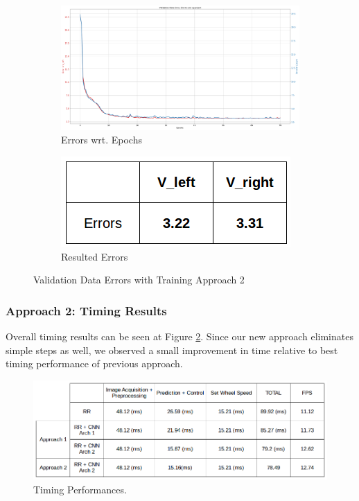 \documentclass[11pt,letterpaper]{article}
\begin{document}
	\begin{figure}[h!]
		\centering
		\begin{subfigure}[b]{0.84\linewidth}
			\includegraphics[width=\linewidth]{err-app2.png}
			\caption{Errors wrt. Epochs}
		\end{subfigure}
		\begin{subfigure}[b]{0.14\linewidth}
			\includegraphics[width=\linewidth]{err-app2-table.png}
			\caption{Resulted Errors}
		\end{subfigure}
		\caption{Validation Data Errors with Training Approach 2}
		\label{fig:12}
	\end{figure}  
	
	\subsubsection{Approach 2: Timing Results}
	Overall timing results can be seen at Figure \ref{fig:13}. Since our new approach eliminates simple steps as well, we observed a small improvement in time relative to best timing performance of previous approach.
	
	\begin{figure}[h!]
		\centering
		\includegraphics[width=1.0\linewidth]{time-app2.png}
		\caption{Timing Performances.}
		\label{fig:13}
	\end{figure}
	
\end{document}
